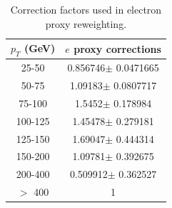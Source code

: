 \begin{table}[htdp]
	\centering
  \begin{tabular}{|c|c|}
  \hline
  $p_T$ (GeV)  & $e$ proxy corrections \\ \hline
  25-50  & 0.856746$\pm$ 0.0471665  \\ \hline
  50-75  & 1.09183$\pm$ 0.0807717  \\ \hline
  75-100  & 1.5452$\pm$ 0.178984  \\ \hline
  100-125  & 1.45478$\pm$ 0.279181  \\ \hline
  125-150  & 1.69047$\pm$ 0.444314  \\ \hline
  150-200  & 1.09781$\pm$ 0.392675  \\ \hline
  200-400  & 0.509912$\pm$ 0.362527  \\ \hline
  $>$ 400 & 1 \\ \hline
  \end{tabular}
  \caption{Correction factors used in electron proxy reweighting.}
  \label{table:correctionsfakelep}
\end{table}

